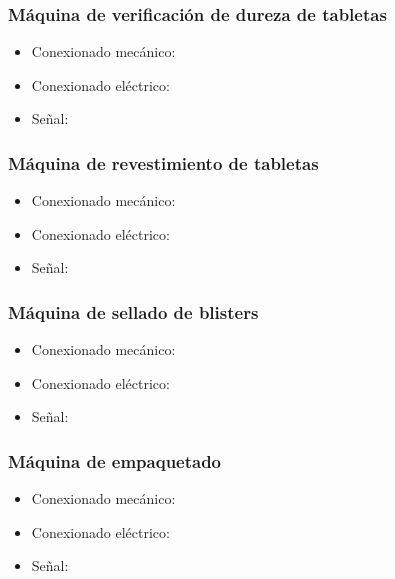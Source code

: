 	\subsubsection{Máquina de verificación de dureza de tabletas}
		\begin{itemize}
				\item{Conexionado mecánico:}\\
				
				\item{Conexionado eléctrico:}\\
				
				\item{Señal:}\\
				
		\end{itemize}

	\subsubsection{Máquina de revestimiento de tabletas}
		\begin{itemize}
				\item{Conexionado mecánico:}\\
				
				\item{Conexionado eléctrico:}\\
				
				\item{Señal:}\\
				
		\end{itemize}

	\subsubsection{Máquina de sellado de blisters }
		\begin{itemize}
				\item{Conexionado mecánico:}\\
				
				\item{Conexionado eléctrico:}\\
				
				\item{Señal:}\\
				
		\end{itemize}
	
	\subsubsection{Máquina de empaquetado}
		\begin{itemize}
				\item{Conexionado mecánico:}\\
				
				\item{Conexionado eléctrico:}\\
				
				\item{Señal:}\\
				
		\end{itemize}

